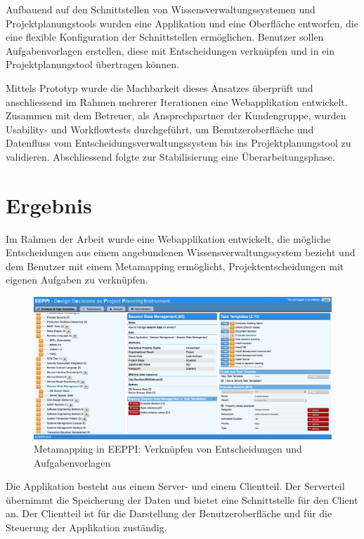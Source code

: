 	Aufbauend auf den Schnittstellen von Wissensverwaltungssystemen und Projektplanungstools wurden eine Applikation und eine Oberfläche entworfen, 
	die eine flexible Konfiguration der Schnittstellen ermöglichen. 
	Benutzer sollen Aufgabenvorlagen erstellen, diese mit Entscheidungen verknüpfen und in ein Projektplanungstool übertragen können. 

	Mittels Prototyp wurde die Machbarkeit dieses Ansatzes überprüft 
	und anschliessend im Rahmen mehrerer Iterationen eine Webapplikation entwickelt. 
	Zusammen mit dem Betreuer, als Ansprechpartner der Kundengruppe, wurden Usability- und Workflowtests durchgeführt, 
	um Benutzeroberfläche und Datenfluss vom Entscheidungsverwaltungssystem bis ins Projektplanungstool zu validieren. 
	Abschliessend folgte zur Stabilisierung eine Überarbeitungsphase.
	
	
	\section{Ergebnis}
		
	Im Rahmen der Arbeit wurde eine Webapplikation entwickelt, 
	die mögliche Entscheidungen aus einem angebundenen Wissensverwaltungssystem bezieht 
	und dem Benutzer mit einem Metamapping ermöglicht,
	Projektentscheidungen mit eigenen Aufgaben zu verknüpfen. 
	
	\begin{figure}[H]
		\includegraphics[width=\textwidth]{introduction/img/eeppiDecisionsAndTaskTemplates.png}
		\centering
		\caption{Metamapping in EEPPI: Verknüpfen von Entscheidungen und Aufgabenvorlagen}
		\label{fig:metamapping}
	\end{figure}	
	
	Die Applikation besteht aus einem Server- und einem Clientteil.
	Der Serverteil übernimmt die Speicherung der Daten und bietet eine Schnittstelle für den Client an.
	Der Clientteil ist für die Darstellung der Benutzeroberfläche und für die Steuerung der Applikation zuständig.
	
